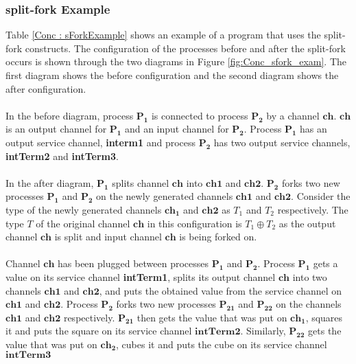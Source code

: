 \documentclass[11pt]{article}
\newcommand{\<}{\langle}
\renewcommand{\>}{\rangle}
\begin{document}
\subsubsection {split-fork Example}

Table \ref {Conc : sForkExample} shows an example of a program that uses the {\sf split-fork} constructs. The configuration of the processes before and after the {\sf split-fork} occurs is shown through the two diagrams in Figure \ref {fig:Conc_sfork_exam}. The first diagram shows the before configuration and the second diagram shows the after configuration. 
~~\\~~\\ 
In the before diagram, process $\mathbf{P_1}$ is connected to process $\mathbf{P_2}$ by a channel $\mathbf{ch}$. $\mathbf{ch}$ is an output channel for $\mathbf{P_1}$ and an input channel for $\mathbf{P_2}$. Process $\mathbf{P_1}$ has an output service channel, {\bf interm1} and process $\mathbf{P_2}$ has two output service channels, {\bf intTerm2} and {\bf intTerm3}. 
~~\\~~\\
In the after diagram, $\mathbf{P_1}$ splits channel $\mathbf{ch}$ into $\mathbf{ch1}$ and $\mathbf{ch2}$. $\mathbf{P_2}$ forks two new processes $\mathbf{P_1}$ and $\mathbf{P_2}$ on the newly generated channels $\mathbf{ch1}$ and $\mathbf{ch2}$. Consider the type of the newly generated channels $\mathbf{ch_1}$ and $\mathbf{ch2}$ as $T_1$ and $T_2$ respectively. The type $T$ of the original channel $\mathbf{ch}$ in this configuration is $T_1 \oplus T_2$ as the output channel $\mathbf{ch}$ is split and input channel $\mathbf{ch}$ is being forked on.
~~\\~~\\ 
Channel $\mathbf{ch}$ has been plugged between processes $\mathbf{P_1}$ and $\mathbf{P_2}$. Process $\mathbf{P_1}$ gets a value on its service channel {\bf intTerm1}, splits its output channel $\mathbf{ch}$ into two channels $\mathbf{ch1}$ and $\mathbf{ch2}$, and puts the obtained value from the service channel on $\mathbf{ch1}$ and $\mathbf{ch2}$. Process $\mathbf{P_2}$ forks two new processes $\mathbf{P_{21}}$ and $\mathbf{P_{22}}$ on the channels $\mathbf{ch1}$ and $\mathbf{ch2}$ respectively. $\mathbf{P_{21}}$ then gets the value that was put on $\mathbf{ch_1}$, squares it and puts the square on its service channel $\mathbf{intTerm2}$. Similarly, $\mathbf{P_{22}}$ gets the value that was put on $\mathbf{ch_2}$, cubes it and puts the cube on its service channel $\mathbf{intTerm3}$
\end{document}

